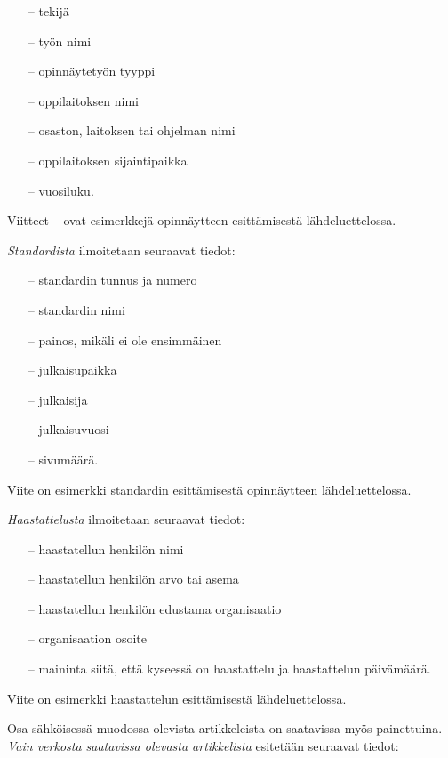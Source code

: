 \documentclass[finnish, 12pt, a4paper, elec, utf8, a-1b, online]{aaltothesis}
\begin{document}
\begin{itemize}
\item[--]tekijä
\item[--]työn nimi
\item[--]opinnäytetyön tyyppi
\item[--]oppilaitoksen nimi
\item[--]osaston, laitoksen tai ohjelman nimi
\item[--]oppilaitoksen sijaintipaikka
\item[--]vuosiluku.
\end{itemize}

Viitteet \cite{Miinusmaa}--\cite{Lonnqvist} ovat esimerkkejä
opinnäytteen esittämisestä lähdeluettelossa.

\textit{Standardista} ilmoitetaan seuraavat tiedot:

\begin{itemize}
\item[--]standardin tunnus ja numero
\item[--]standardin nimi
\item[--]painos, mikäli ei ole ensimmäinen
\item[--]julkaisupaikka
\item[--]julkaisija
\item[--]julkaisuvuosi
\item[--]sivumäärä.
\end{itemize}
Viite \cite{sfs} on esimerkki standardin esittämisestä opinnäytteen
lähdeluettelossa.

\textit{Haastattelusta} ilmoitetaan seuraavat tiedot:

\begin{itemize}
\item[--]haastatellun henkilön nimi
\item[--]haastatellun henkilön arvo tai asema
\item[--]haastatellun henkilön edustama organisaatio
\item[--]organisaation osoite
\item[--]maininta siitä, että kyseessä on haastattelu ja haastattelun
päivämäärä.
\end{itemize}

Viite \cite{haastattelu} on esimerkki
haastattelun esittämisestä lähdeluettelossa.

Osa sähköisessä muodossa olevista artikkeleista on saatavissa myös
painettuina. \textit{Vain verkosta saatavissa olevasta artikkelista} esitetään
seuraavat tiedot:
\end{document}
